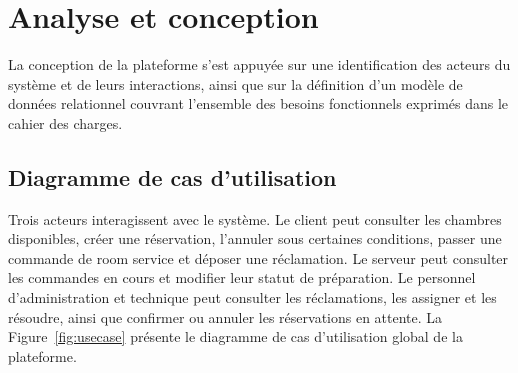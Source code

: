 \documentclass[12pt,a4paper]{report}
\begin{document}
\section{Analyse et conception}

La conception de la plateforme s'est appuyée sur une identification des
acteurs du système et de leurs interactions, ainsi que sur la définition
d'un modèle de données relationnel couvrant l'ensemble des besoins
fonctionnels exprimés dans le cahier des charges.

\subsection{Diagramme de cas d'utilisation}

Trois acteurs interagissent avec le système. Le client peut consulter les
chambres disponibles, créer une réservation, l'annuler sous certaines
conditions, passer une commande de room service et déposer une
réclamation. Le serveur peut consulter les commandes en cours et modifier
leur statut de préparation. Le personnel d'administration et technique
peut consulter les réclamations, les assigner et les résoudre, ainsi que
confirmer ou annuler les réservations en attente. La Figure~\ref{fig:usecase}
présente le diagramme de cas d'utilisation global de la plateforme.
\end{document}
